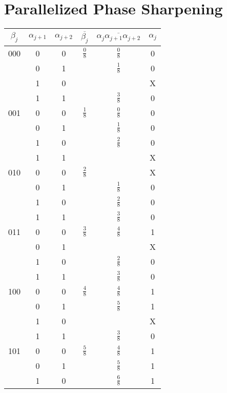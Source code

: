 \section{Parallelized Phase Sharpening}
\label{sec:sharp}

\begin{tabular}{|c|c|c||c|c||c|}
\hline
$\beta_j$ & $\alpha_{j+1}$ & $\alpha_{j+2}$ & $\overline{\beta_j}$ & $\overline{\alpha_j\alpha_{j+1}\alpha_{j+2}}$ & $\alpha_j$\\
\hline
000 & 0 & 0 & $\frac{0}{8}$ & $\frac{0}{8}$ & 0\\
    & 0 & 1 &               & $\frac{1}{8}$ & 0\\
    & 1 & 0 &               &               & X\\
    & 1 & 1 &               & $\frac{3}{8}$ & 0\\
\hline
001 & 0 & 0 & $\frac{1}{8}$ & $\frac{0}{8}$ & 0\\
    & 0 & 1 &               & $\frac{1}{8}$ & 0\\
    & 1 & 0 &               & $\frac{2}{8}$ & 0\\
    & 1 & 1 &               &               & X\\
\hline
010 & 0 & 0 & $\frac{2}{8}$ &               & X\\
    & 0 & 1 &               & $\frac{1}{8}$ & 0\\
    & 1 & 0 &               & $\frac{2}{8}$ & 0\\
    & 1 & 1 &               & $\frac{3}{8}$ & 0\\
\hline
011 & 0 & 0 & $\frac{3}{8}$ & $\frac{4}{8}$ & 1\\
    & 0 & 1 &               &               & X\\
    & 1 & 0 &               & $\frac{2}{8}$ & 0\\
    & 1 & 1 &               & $\frac{3}{8}$ & 0\\
\hline
100 & 0 & 0 & $\frac{4}{8}$ & $\frac{4}{8}$ & 1\\
    & 0 & 1 &               & $\frac{5}{8}$ & 1\\
    & 1 & 0 &               &               & X\\
    & 1 & 1 &               & $\frac{3}{8}$ & 0\\
\hline
101 & 0 & 0 & $\frac{5}{8}$ & $\frac{4}{8}$ & 1\\
    & 0 & 1 &               & $\frac{5}{8}$ & 1\\
    & 1 & 0 &               & $\frac{6}{8}$ & 1\\

\end{tabular}
